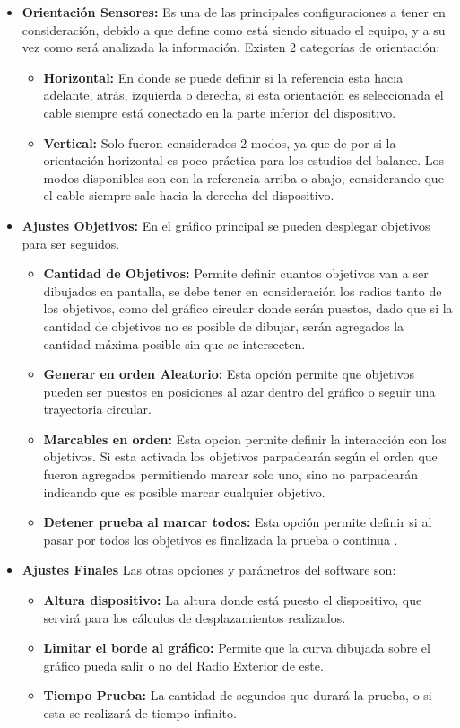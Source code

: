 \documentclass[12pt,a4paper]{article}
\begin{document}
\begin{itemize}
	\item \textbf{Orientación Sensores:} Es una de las principales configuraciones a tener en consideración, debido a que define como está siendo situado el equipo, y a su vez como será analizada la información.
	Existen 2 categorías de orientación:
	\begin{itemize}
		\item \textbf{Horizontal:} En donde se puede definir si la referencia esta hacia adelante, atrás, izquierda o derecha, si esta orientación es seleccionada el cable siempre está conectado en la parte inferior del dispositivo.
		\item \textbf{Vertical:} Solo fueron considerados 2 modos, ya que de por si la orientación horizontal es poco práctica para los estudios del balance.
		Los modos disponibles son con la referencia arriba o abajo, considerando que el cable siempre sale hacia la derecha del dispositivo.
	\end{itemize}
	\item \textbf{Ajustes Objetivos:} En el gráfico principal se pueden desplegar objetivos para ser seguidos.
	\begin{itemize}
		\item \textbf{Cantidad de Objetivos:} Permite definir cuantos objetivos van a ser dibujados en pantalla, se debe tener en consideración los radios tanto de los objetivos, como del gráfico circular donde serán puestos, dado que si la cantidad de objetivos no es posible de dibujar, serán agregados la cantidad máxima posible sin que se intersecten.
		\item \textbf{Generar en orden Aleatorio:} Esta opción permite que objetivos pueden ser puestos en posiciones al azar dentro del gráfico o seguir una trayectoria circular.
		\item \textbf{Marcables en orden:} Esta opcion permite definir la interacción con los objetivos.
		Si esta activada los objetivos parpadearán según el orden que fueron agregados permitiendo marcar solo uno, sino no parpadearán indicando que es posible marcar cualquier objetivo.
		\item \textbf{Detener prueba al marcar todos:} Esta opción permite definir si al pasar por todos los objetivos es finalizada la prueba o continua .
	\end{itemize}
	
	\item \textbf{Ajustes Finales} Las otras opciones y parámetros del software son:
	\begin{itemize}
		\item \textbf{Altura dispositivo:} La altura donde está puesto el dispositivo, que servirá para los cálculos de desplazamientos realizados.
		\item \textbf{Limitar el borde al gráfico:} Permite que la curva dibujada sobre el gráfico pueda salir o no del Radio Exterior de este.
		\item \textbf{Tiempo Prueba:} La cantidad de segundos que durará la prueba, o si esta se realizará de tiempo infinito.
	\end{itemize}
\end{itemize}
\end{document}
